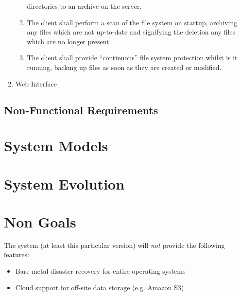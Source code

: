 \begin{enumerate}
\begin{enumerate}
                directories to an archive on the server.
            \item The client shall perform a scan of the file system on
                startup, archiving any files which are not up-to-date and
                signifying the deletion any files which are no longer present
            \item The client shall provide ``continuous'' file system
                protection whilst is it running, backing up files as soon as
                they are created or modified.
        \end{enumerate}
    \item Web Interface
\end{enumerate}

\subsection{Non-Functional Requirements}

\section{System Models}

\section{System Evolution}

\section{Non Goals}

The system (at least this particular version) will \emph{not} provide the
following features:

\begin{itemize}
    \item Bare-metal disaster recovery for entire operating systems
    \item Cloud support for off-site data storage (e.g. Amazon S3)
\end{itemize}
